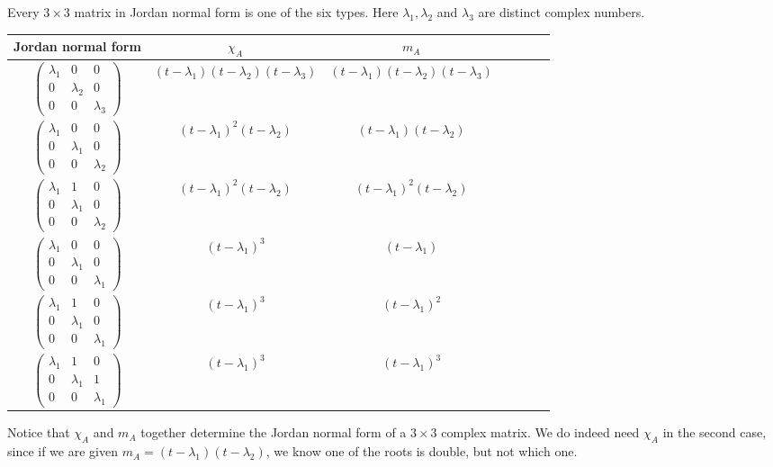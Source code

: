 \documentclass[a4paper,11pt]{article}
\begin{document}
\begin{example}
	Every $3\times 3$ matrix in Jordan normal form is one of the six types. Here $\lambda_1, \lambda_2$ and $\lambda_3$ are distinct complex numbers.
  \begin{center}
    \begin{tabular}{ccccccc}
      \toprule
      Jordan normal form & $\chi_A$ & $m_A$\\
      \midrule
      $\begin{pmatrix} \lambda_1 & 0 & 0\\ 0 & \lambda_2 & 0\\ 0 & 0 & \lambda_3 \end{pmatrix}$ & $(t - \lambda_1)(t - \lambda_2)(t- \lambda_3)$ & $(t - \lambda_1)(t - \lambda_2)(t- \lambda_3)$\\\addlinespace
      $\begin{pmatrix} \lambda_1 & 0 & 0\\ 0 & \lambda_1 & 0\\ 0 & 0 & \lambda_2 \end{pmatrix}$ & $(t - \lambda_1)^2 (t - \lambda_2)$ & $(t - \lambda_1) (t - \lambda_2)$\\\addlinespace
      $\begin{pmatrix} \lambda_1 & 1 & 0\\ 0 & \lambda_1 & 0\\ 0 & 0 & \lambda_2 \end{pmatrix}$ & $(t - \lambda_1)^2 (t - \lambda_2)$ & $(t - \lambda_1)^2 (t - \lambda_2)$\\\addlinespace
      $\begin{pmatrix} \lambda_1 & 0 & 0\\ 0 & \lambda_1 & 0\\ 0 & 0 & \lambda_1 \end{pmatrix}$ & $(t - \lambda_1)^3$ & $(t - \lambda_1)$\\\addlinespace
      $\begin{pmatrix} \lambda_1 & 1 & 0\\ 0 & \lambda_1 & 0\\ 0 & 0 & \lambda_1 \end{pmatrix}$ & $(t - \lambda_1)^3$ & $(t - \lambda_1)^2$\\\addlinespace
      $\begin{pmatrix} \lambda_1 & 1 & 0\\ 0 & \lambda_1 & 1\\ 0 & 0 & \lambda_1 \end{pmatrix}$ & $(t - \lambda_1)^3$ & $(t - \lambda_1)^3$\\
      \bottomrule
    \end{tabular}
  \end{center}
  Notice that $\chi_A$ and $m_A$ together determine the Jordan normal form of a $3\times 3$ complex matrix. We do indeed need $\chi_A$ in the second case, since if we are given $m_A = (t - \lambda_1)(t - \lambda_2)$, we know one of the roots is double, but not which one.
\end{example}
\end{document}
